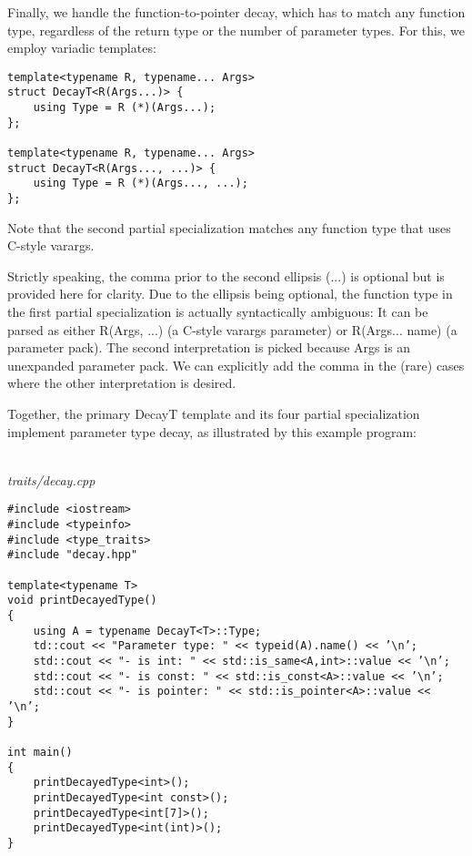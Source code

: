 Finally, we handle the function-to-pointer decay, which has to match any function type, regardless of the return type or the number of parameter types. For this, we employ variadic templates:

\begin{lstlisting}[style=styleCXX]
template<typename R, typename... Args>
struct DecayT<R(Args...)> {
	using Type = R (*)(Args...);
};

template<typename R, typename... Args>
struct DecayT<R(Args..., ...)> {
	using Type = R (*)(Args..., ...);
};
\end{lstlisting}

Note that the second partial specialization matches any function type that uses C-style varargs.

\begin{tcolorbox}[colback=webgreen!5!white,colframe=webgreen!75!black]
\hspace*{0.75cm}Strictly speaking, the comma prior to the second ellipsis (...) is optional but is provided here for clarity. Due to the ellipsis being optional, the function type in the first partial specialization is actually syntactically ambiguous: It can be parsed as either R(Args, ...) (a C-style varargs parameter) or R(Args... name) (a parameter pack). The second interpretation is picked because Args is an unexpanded parameter pack. We can explicitly add the comma in the (rare) cases where the other interpretation is desired.
\end{tcolorbox}

Together, the primary DecayT template and its four partial specialization implement parameter type decay, as illustrated by this example program:

\hspace*{\fill} \\ %
\noindent
\textit{traits/decay.cpp}
\begin{lstlisting}[style=styleCXX]
#include <iostream>
#include <typeinfo>
#include <type_traits>
#include "decay.hpp"

template<typename T>
void printDecayedType()
{
	using A = typename DecayT<T>::Type;
	td::cout << "Parameter type: " << typeid(A).name() << ’\n’;
	std::cout << "- is int: " << std::is_same<A,int>::value << ’\n’;
	std::cout << "- is const: " << std::is_const<A>::value << ’\n’;
	std::cout << "- is pointer: " << std::is_pointer<A>::value << ’\n’;
}

int main()
{
	printDecayedType<int>();
	printDecayedType<int const>();
	printDecayedType<int[7]>();
	printDecayedType<int(int)>();
}
\end{lstlisting}

